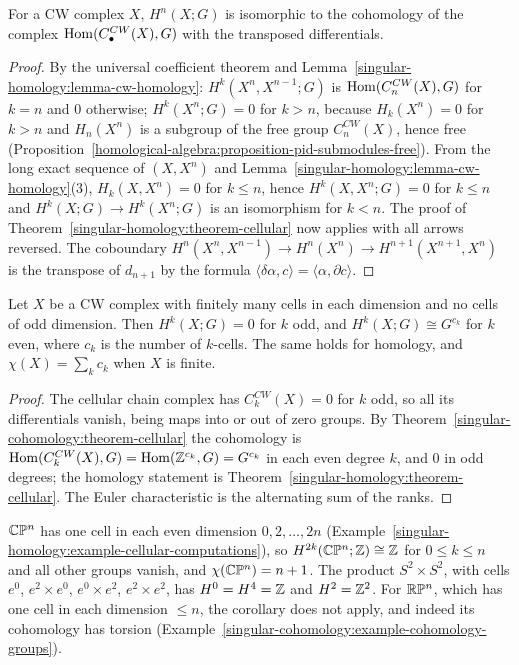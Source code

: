 \begin{theorem}\label{singular-cohomology:theorem-cellular}
For a CW complex $X$, $H^n(X; G)$ is isomorphic to the cohomology of the complex $\operatorname{Hom}(C^{CW}_\bullet(X), G)$ with the transposed differentials.
\end{theorem}

\begin{proof}
By the universal coefficient theorem and Lemma~\ref{singular-homology:lemma-cw-homology}: $H^k(X^n, X^{n-1}; G)$ is $\operatorname{Hom}(C^{CW}_n(X), G)$ for $k = n$ and $0$ otherwise;
$H^k(X^n; G) = 0$ for $k > n$, because $H_k(X^n) = 0$ for $k > n$ and $H_n(X^n)$ is a subgroup of the free group $C^{CW}_n(X)$, hence free
(Proposition~\ref{homological-algebra:proposition-pid-submodules-free}). From the long exact sequence of $(X, X^n)$ and
Lemma~\ref{singular-homology:lemma-cw-homology}(3), $H_k(X, X^n) = 0$ for $k \leq n$, hence $H^k(X, X^n; G) = 0$ for $k \leq n$ and $H^k(X; G) \to H^k(X^n; G)$ is an
isomorphism for $k < n$. The proof of Theorem~\ref{singular-homology:theorem-cellular} now applies with all arrows reversed. The coboundary
$H^n(X^n, X^{n-1}) \to H^n(X^n) \to H^{n+1}(X^{n+1}, X^n)$ is the transpose of $d_{n+1}$ by the formula $\langle\delta\alpha, c\rangle = \langle\alpha, \partial c\rangle$.
\end{proof}

\begin{corollary}\label{singular-cohomology:corollary-even-cells}
Let $X$ be a CW complex with finitely many cells in each dimension and no cells of odd dimension. Then $H^k(X; G) = 0$ for $k$ odd, and $H^k(X; G) \cong G^{c_k}$ for $k$ even, where $c_k$ is the
number of $k$-cells. The same holds for homology, and $\chi(X) = \sum_kc_k$ when $X$ is finite.
\end{corollary}

\begin{proof}
The cellular chain complex has $C^{CW}_k(X) = 0$ for $k$ odd, so all its differentials vanish, being maps into or out of zero groups. By Theorem~\ref{singular-cohomology:theorem-cellular} the cohomology is
$\operatorname{Hom}(C^{CW}_k(X), G) = \operatorname{Hom}(\mathbb{Z}^{c_k}, G) = G^{c_k}$ in each even degree $k$, and $0$ in odd degrees; the homology statement is Theorem~\ref{singular-homology:theorem-cellular}. The Euler characteristic is
the alternating sum of the ranks.
\end{proof}

\begin{example}\label{singular-cohomology:example-even-cells}
$\mathbb{C}\mathbb{P}^n$ has one cell in each even dimension $0, 2, \ldots, 2n$ (Example~\ref{singular-homology:example-cellular-computations}), so $H^{2k}(\mathbb{C}\mathbb{P}^n; \mathbb{Z}) \cong \mathbb{Z}$ for $0 \leq k \leq n$ and all other groups
vanish, and $\chi(\mathbb{C}\mathbb{P}^n) = n + 1$. The product $S^2 \times S^2$, with cells $e^0$, $e^2 \times e^0$, $e^0 \times e^2$, $e^2 \times e^2$, has $H^0 = H^4 = \mathbb{Z}$ and $H^2 = \mathbb{Z}^2$. For $\mathbb{R}\mathbb{P}^n$, which has one
cell in each dimension $\leq n$, the corollary does not apply, and indeed its cohomology has torsion (Example~\ref{singular-cohomology:example-cohomology-groups}).
\end{example}

